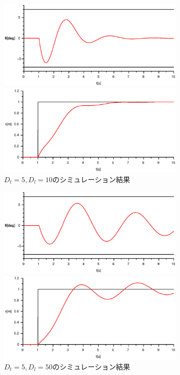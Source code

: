 \documentclass[titlepage]{jsarticle}
\begin{document}
            \begin{figure}[h]
                \begin{minipage}{0.5\hsize}
                    \centering
                    \includegraphics[width=9cm]{img/D5-10t.eps}
                \end{minipage}
                \begin{minipage}{0.5\hsize}
                    \centering
                    \includegraphics[width=9cm]{img/D5-10x.eps}
                \end{minipage}
                \caption{$D_t = 5, D_l = 10$のシミュレーション結果}
                \label{fig:d5-10}
            \end{figure}
            \begin{figure}[h]
                \begin{minipage}{0.5\hsize}
                    \centering
                    \includegraphics[width=9cm]{img/D5-50t.eps}
                \end{minipage}
                \begin{minipage}{0.5\hsize}
                    \centering
                    \includegraphics[width=9cm]{img/D5-50x.eps}
                \end{minipage}
                \caption{$D_t = 5, D_l = 50$のシミュレーション結果}
                \label{fig:d5-50}
            \end{figure}
\end{document}
